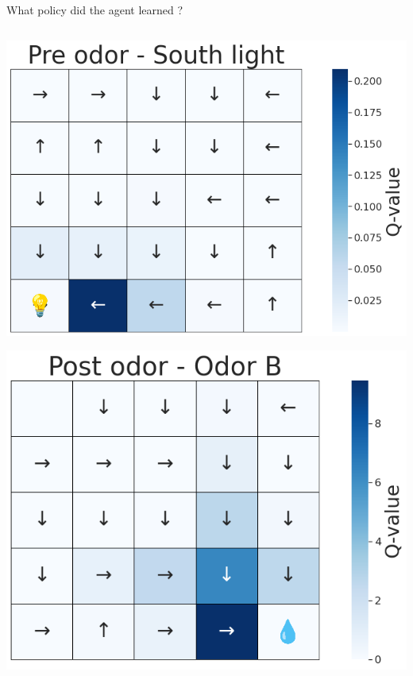 \documentclass[bigger]{beamer}
\begin{document}
\begin{frame}[label={sec:orgc1fc0cc}]{What policy did the agent learned ?}
\begin{columns}
\begin{column}[t]{0.5\columnwidth}
\begin{center}
\includegraphics[height=0.4\textheight]{img/policy-allo-south-light.png}
\end{center}
\begin{center}
\includegraphics[height=0.4\textheight]{img/policy-allo-odor-B.png}
\end{center}
\end{column}
\end{columns}
\end{frame}
\end{document}
